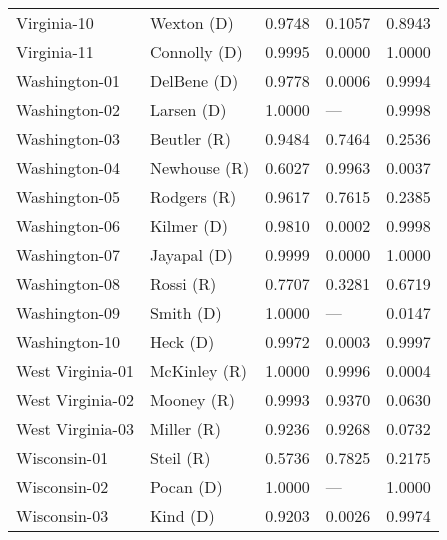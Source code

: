 \begin{longtable}{llrll}
       Virginia-10 &           {\color{Blue} Wexton (D)} &       0.9748 &        0.1057 &        0.8943 \\
       Virginia-11 &         {\color{Blue} Connolly (D)} &       0.9995 &        0.0000 &        1.0000 \\
     Washington-01 &          {\color{Blue} DelBene (D)} &       0.9778 &        0.0006 &        0.9994 \\
     Washington-02 &           {\color{Blue} Larsen (D)} &       1.0000 &           --- &        0.9998 \\
     Washington-03 &           {\color{Red} Beutler (R)} &       0.9484 &        0.7464 &        0.2536 \\
     Washington-04 &          {\color{Red} Newhouse (R)} &       0.6027 &        0.9963 &        0.0037 \\
     Washington-05 &           {\color{Red} Rodgers (R)} &       0.9617 &        0.7615 &        0.2385 \\
     Washington-06 &           {\color{Blue} Kilmer (D)} &       0.9810 &        0.0002 &        0.9998 \\
     Washington-07 &          {\color{Blue} Jayapal (D)} &       0.9999 &        0.0000 &        1.0000 \\
     Washington-08 &             {\color{Red} Rossi (R)} &       0.7707 &        0.3281 &        0.6719 \\
     Washington-09 &            {\color{Blue} Smith (D)} &       1.0000 &           --- &        0.0147 \\
     Washington-10 &             {\color{Blue} Heck (D)} &       0.9972 &        0.0003 &        0.9997 \\
  West Virginia-01 &          {\color{Red} McKinley (R)} &       1.0000 &        0.9996 &        0.0004 \\
  West Virginia-02 &            {\color{Red} Mooney (R)} &       0.9993 &        0.9370 &        0.0630 \\
  West Virginia-03 &            {\color{Red} Miller (R)} &       0.9236 &        0.9268 &        0.0732 \\
      Wisconsin-01 &             {\color{Red} Steil (R)} &       0.5736 &        0.7825 &        0.2175 \\
      Wisconsin-02 &            {\color{Blue} Pocan (D)} &       1.0000 &           --- &        1.0000 \\
      Wisconsin-03 &             {\color{Blue} Kind (D)} &       0.9203 &        0.0026 &        0.9974 \\

\end{longtable}
